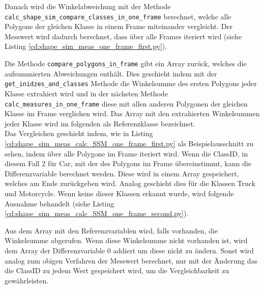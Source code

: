 {	Danach wird die Winkelabweichung mit der Methode \lstinline|calc_shape_sim_compare_classes_in_one_frame| berechnet, welche alle Polygone der gleichen Klasse in einem Frame miteinander vergleicht. Der Messwert wird dadurch berechnet, dass über alle Frames iteriert wird (siehe Listing \ref{cd:shape_sim_meas_one_frame_first.py}).
	 
	Die Methode \lstinline|compare_polygons_in_frame| gibt ein Array zurück, welches die aufsummierten Abweichungen enthält. Dies geschieht indem mit der \lstinline|get_inidzes_and_classes| Methode die Winkelsumme des ersten Polygons jeder Klasse extrahiert wird und in der nächsten Methode \lstinline|calc_measures_in_one_frame| diese mit allen anderen Polygonen der gleichen Klasse im Frame verglichen wird. Das Array mit den extrahierten Winkelsummen jeder Klasse wird im folgenden als Referenzklasse bezeichnet.\\
	Das Vergleichen geschieht indem, wie in Listing \ref{cd:shape_sim_meas_calc_SSM_one_frame_first.py} als Beispielausschnitt zu sehen, indem über alle Polygone im Frame iteriert wird. Wenn die ClassID, in diesem Fall 2 für Car, mit der des Polygons im Frame übereinstimmt, kann die Differenzvariable berechnet werden. 
	 Diese wird in einem Array gespeichert, welches am Ende zurückgeben wird. Analog geschieht dies für die Klassen Truck und Motorcycle. Wenn keine dieser Klassen erkannt wurde, wird folgende Ausnahme behandelt (siehe Listing \ref{cd:shape_sim_meas_calc_SSM_one_frame_second.py}). 
	 
	Aus dem Array mit den Referenzvariablen wird, falls vorhanden, die Winkelsumme abgerufen. Wenn diese Winkelsumme nicht vorhanden ist, wird dem Array der Differenzvariable 0 addiert um diese nicht zu ändern. Sonst wird analog zum obigen Verfahren der Messwert berechnet, nur mit der Änderung das die ClassID zu jedem Wert gespeichert wird, um die Vergleichbarkeit zu gewährleisten. \\
}
